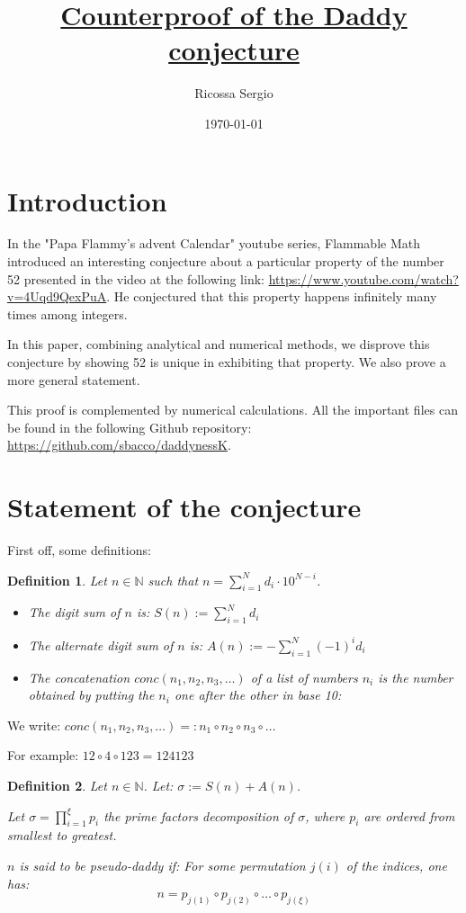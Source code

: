 \documentclass[a4paper, 11pt]{report}
\date{\Large{ \today}}
\author{\Large{Ricossa Sergio}}
\newtheorem{definition}{Definition}
\begin{document}
\title{\Huge{\underline{Counterproof of the Daddy conjecture}}}

\maketitle
\thispagestyle{fancy}
\newpage
\section{Introduction}
	In the "Papa Flammy's advent Calendar" youtube series, Flammable Math introduced an interesting conjecture about a particular property of the number 52 presented in the video at the following link: \url{https://www.youtube.com/watch?v=4Uqd9QexPuA}. He conjectured that this property happens infinitely many times among integers.
	
	In this paper, combining analytical and numerical methods, we disprove this conjecture by showing 52 is unique in exhibiting that property. We also prove a more general statement.
	
	This proof is complemented by numerical calculations. All the important files can be found in the following Github repository: \url{https://github.com/sbacco/daddynessK}.

\section{Statement of the conjecture}

	First off, some definitions:
	\begin{definition}
		Let $n\in\mathbb{N}$ such that $n = \sum_{i=1}^Nd_i\cdot10^{N-i}$.
		
		\begin{itemize}
			\item The \emph{digit sum} of $n$ is: $S(n):=\sum_{i=1}^Nd_i$
			\item The \emph{alternate digit sum} of $n$ is: $A(n):=-\sum_{i=1}^N(-1)^id_i$
			\item The \emph{concatenation} $conc(n_1,n_2,n_3,\dots)$ of a list of numbers $n_i$ is the number obtained by putting the $n_i$ one after the other in base 10:
		\end{itemize}
	\end{definition}

	We write: $conc(n_1,n_2,n_3,\dots) =: n_1\circ n_2\circ n_3\circ\dots$
			
	For example: $12\circ4\circ123=124123$
	
	\begin{definition}
		Let $n\in\mathbb{N}$. Let: $\sigma:=S(n)+A(n)$. 
		
		Let $\sigma=\prod_{i=1}^\xi p_i$ the prime factors decomposition of $\sigma$, where $p_i$ are ordered from smallest to greatest.
		
		$n$ is said to be \emph{pseudo-daddy} if:
		For some permutation $j(i)$ of the indices, one has:
		$$n=p_{j(1)}\circ p_{j(2)}\circ\dots\circ p_{j(\xi)}$$
		
	\end{definition}
	
\end{document}
